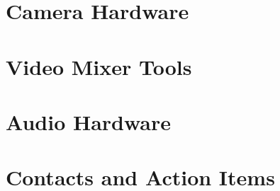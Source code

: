 \documentclass[aspectratio=169]{beamer}
\begin{document}
%
%


\section{Camera Hardware}

%



\section{Video Mixer Tools}



\section{Audio Hardware}




\section{Contacts and Action Items}

%
%


\end{document}
